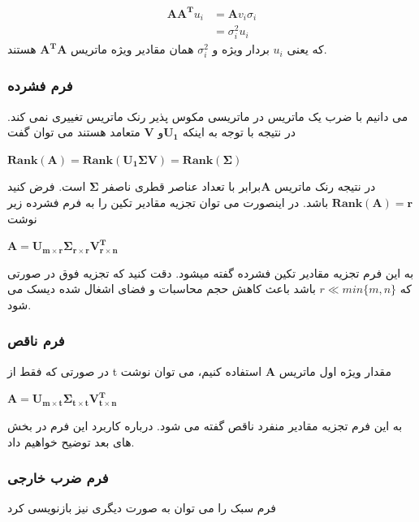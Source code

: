	
	\begin{align}
	\mathbf{AA^T} u_i  & = \mathbf{A}v_i \sigma_i\\ \nonumber
	                   & = \sigma_i^2 u_i \nonumber
	\end{align}
 	که یعنی $ u_i $ بردار ویژه و $ \sigma_i^2 $ همان مقادیر ویژه ماتریس $\mathbf{A^TA} $ هستند.\\
 	
 	\subsubsection{فرم فشرده}
 	می دانیم با ضرب یک ماتریس در ماتریسی مکوس پذیر رنک ماتریس تغییری نمی کند. در نتیجه با توجه به اینکه $\mathbf{U_1} $و $\mathbf{V} $ متعامد هستند می توان گفت 
 	\begin{center} 
 		$ \mathbf{Rank(A) = Rank(U_1\Sigma V) = Rank(\Sigma)} $
 	\end{center}
 	در نتیجه رنک ماتریس  $ \mathbf{A} $برابر با تعداد عناصر قطری ناصفر $ \mathbf{\Sigma}$ است. 
 	فرض کنید $\mathbf{Rank(A) = r} $ باشد. در اینصورت می توان تجزیه مقادیر تکین را به فرم فشرده زیر نوشت 
 	\begin{center} 
 		$ \mathbf{A = U_{m \times r}\Sigma_{r \times r} V^T_{r \times n}} $
 	\end{center}
 	به این فرم تجزیه مقادیر تکین فشرده گفته میشود. دقت کنید که تجزیه فوق در صورتی که $ r \ll min\{m, n\} $ باشد باعث کاهش حجم محاسبات و فضای اشغال شده دیسک می شود.
 	
 	 \subsubsection{فرم ناقص}
 	 در صورتی که فقط از t مقدار ویژه اول ماتریس $ \mathbf{A}$ استفاده  کنیم، ‌می توان نوشت 
 	 
 	  \begin{center} 
 	 	$ \mathbf{A = U_{m \times t}\Sigma_{t \times t} V^T_{t \times n}} $
 	 \end{center}
  	به این فرم تجزیه مقادیر منفرد ناقص  گفته می شود. درباره کاربرد این فرم در بخش های بعد توضیح خواهیم داد.
  	 \subsubsection{فرم ضرب خارجی}
  	 فرم سبک را می توان به صورت دیگری نیز بازنویسی کرد 

